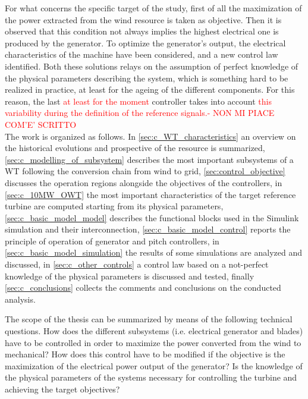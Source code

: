 For what concerns the specific target of the study, first of all the maximization of the power extracted from the wind resource is taken as objective. Then it is observed that this condition not always implies the highest electrical one is produced by the generator. To optimize the generator's output, the electrical characteristics of the machine have been considered, and a new control law identified. Both these solutions relays on the assumption of perfect knowledge of the physical parameters describing the system, which is something hard to be realized in practice, at least for the ageing of the different components. For this reason, the last \textcolor{red}{at least for the moment} controller takes into account \textcolor{red}{this variability during the definition of the reference signals.- NON MI PIACE COM'E' SCRITTO} \\
The work is organized as follows. In \autoref{sec:c_WT_characteristics} an overview on the historical evolutions and prospective of the resource is summarized, \autoref{sec:c_modelling_of_subsystem} describes the most important subsystems of a WT following the conversion chain from wind to grid, \autoref{sec:control_objective} discusses the operation regions alongside the objectives of the controllers, in \autoref{sec:c_10MW_OWT} the most important characteristics of the target reference turbine are computed starting from its physical parameters, \autoref{sec:c_basic_model_model} describes the functional blocks used in the Simulink simulation and their interconnection, \autoref{sec:c_basic_model_control} reports the principle of operation of generator and pitch controllers, in \autoref{sec:c_basic_model_simulation} the results of some simulations are analyzed and discussed, in \autoref{sec:c_other_controls} a control law based on a not-perfect knowledge of the physical parameters is discussed and tested, finally \autoref{sec:c_conclusions} collects the comments and conclusions on the conducted analysis.

The scope of the thesis can be summarized by means of the following technical questions. How does the different subsystems (i.e. electrical generator and blades) have to be controlled in order to maximize the power converted from the wind to mechanical? How does this control have to be modified if the objective is the maximization of the electrical power output of the generator? Is the knowledge of the physical parameters of the systems necessary for controlling the turbine and achieving the target objectives? 


